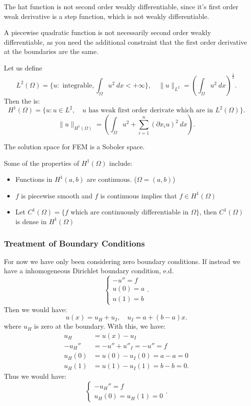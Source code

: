 \documentclass[../main/main.tex]{subfiles}
\begin{document}
\begin{example}
    The hat function is not second order weakly differentiable, since it's first order weak derivative is a step function, which is not weakly differentiable. 
\end{example}
\begin{remark}
    A piecewise quadratic function is not necessarily second order weakly differentiable, as you need the additional constraint that the first order derivative at the boundaries are the same. 
\end{remark}
\begin{definition}
    Let us define
  \[
      L^2(\Omega) = \{u: \text{ integrable}, \int_\Omega u^2 ~dx < +\infty\}, \quad \|u\|_{L^2} = \left( \int_{\Omega}u^2~dx \right) ^ \frac{1}{2}
      .\] Then the  is: \[
  H^1(\Omega) = \{ u: u \in L^2, \quad \text{$u$ has weak first order derivate which are in $L^2(\Omega)$} \} 
  .\] \[
  \|u\|_{H^{1}(\Omega)} = \left( \int_{\Omega}u^2 + \sum_{i=1}^{n} (\partial x_i u)^2~dx \right) 
  .\] 
\end{definition}
\begin{remark}
    The solution space for FEM is a Soboler space.
\end{remark}
Some of the properties of $H^1(\Omega)$ include: 
\begin{itemize}
    \item Functions in $H^1(a,b)$ are continuous. ($\Omega = (a,b)$)
    \item $f$ is piecewise smooth and $f$ is continuous implies that $f \in H^1(\Omega)$ 
    \item Let $C^1(\Omega) = \{f \text{ which are continuously differentiable in $\Omega$}\} $, then $C^1(\Omega)$ is dense in $H^1(\Omega)$
\end{itemize}
\subsubsection{Treatment of Boundary Conditions}
For now we have only been considering zero boundary conditions. If instead we have a inhomogeneous Dirichlet boundary condition, e.d. \[
\begin{cases}
    -u'' = f \\
    u(0) = a \\
    u(1) = b
\end{cases}
.\] Then we would have: \[
u(x) = u_H + u_I, \quad u_I = a+(b-a)x
.\] where $u_H$ is zero at the boundary. With this, we have: 
\begin{align*}
    u_H &= u(x) - u_I \\
    -u_H'' &= -u'' + u''_I = -u'' = f \\
    u_H(0) &= u(0) - u_I(0) = a-a = 0 \\  
    u_H(1) &= u(1) - u_I(1) = b-b = 0 
.\end{align*}
Thus we would have: \[
\begin{cases}
    -u_H'' = f \\
    u_{H}(0) = u_H\left( 1 \right)  = 0
\end{cases}
.\]
\end{document}
